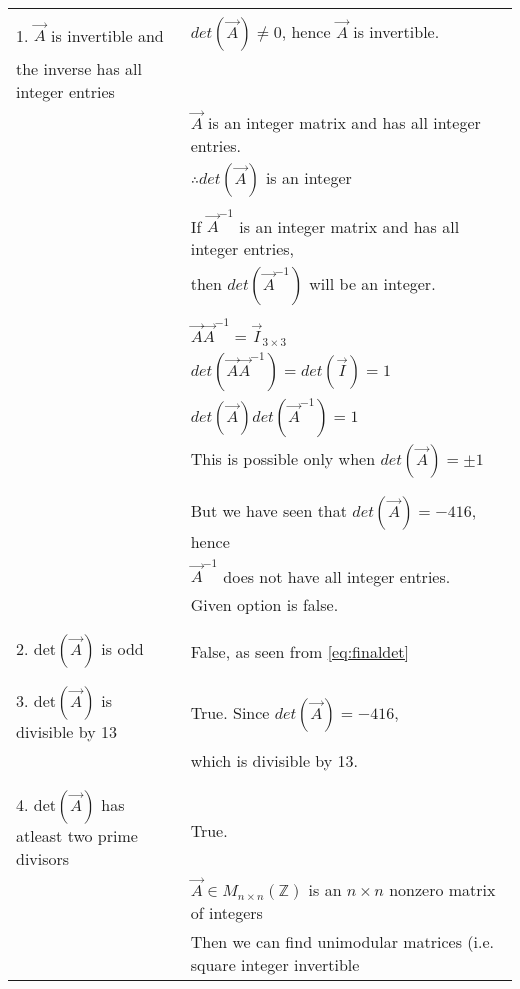 \documentclass[journal,12pt]{IEEEtran}
\begin{document}
\begin{longtable}{|l|l|}
    \hline
        & \\
        1. $\vec{A}$ is invertible and & $det(\vec{A}) \neq 0$, hence $\vec{A}$ is invertible.\\
        the inverse has all integer entries & \\
        & $\vec{A}$ is an integer matrix and has all integer entries.\\
        & $\therefore det(\vec{A})$ is an integer\\
        & \\
        & If $\vec{A}^{-1}$ is an integer matrix and has all integer entries,\\ & then $det(\vec{A}^{-1})$ will be an integer.\\
        & \\
        & $\vec{A}\vec{A}^{-1} = \vec{I}_{3 \times 3}$\\
        & $det(\vec{A}\vec{A}^{-1}) = det(\vec{I}) = 1$\\
        & $det(\vec{A})det(\vec{A}^{-1}) = 1$\\
        & This is possible only when $det(\vec{A}) = \pm 1$\\
        & \\
    \hline
        & \\
        & But we have seen that $det(\vec{A}) = -416$, hence\\
        & $\vec{A}^{-1}$ does not have all integer entries.\\
        & Given option is false.\\
        & \\
    \hline
        & \\
        2. det$(\vec{A})$ is odd & False, as seen from \eqref{eq:finaldet}\\
        & \\
    \hline
        & \\
        3. det$(\vec{A})$ is divisible by 13 & True. Since $det(\vec{A}) = -416$,\\
        & which is divisible by 13.\\
        & \\
    \hline
        & \\
        4. det$(\vec{A})$ has atleast two prime divisors & True.\\
        & $\vec{A} \in M_{n \times n}(\mathbb Z)$ is an $n \times n$ nonzero matrix of integers\\
        & Then we can find unimodular matrices (i.e. square integer invertible\\

\end{longtable}
\end{document}
